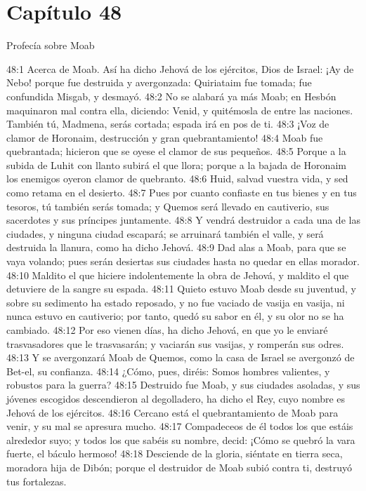 \section*{Capítulo 48 }
Profecía sobre Moab 
 
48:1 Acerca de Moab. Así ha dicho Jehová de los ejércitos, Dios de Israel: ¡Ay de Nebo! porque fue destruida y avergonzada: Quiriataim fue tomada; fue confundida Misgab, y desmayó. 
48:2 No se alabará ya más Moab; en Hesbón maquinaron mal contra ella, diciendo: Venid, y quitémosla de entre las naciones. También tú, Madmena, serás cortada; espada irá en pos de ti. 
48:3 ¡Voz de clamor de Horonaim, destrucción y gran quebrantamiento! 
48:4 Moab fue quebrantada; hicieron que se oyese el clamor de sus pequeños. 
48:5 Porque a la subida de Luhit con llanto subirá el que llora; porque a la bajada de Horonaim los enemigos oyeron clamor de quebranto. 
48:6 Huid, salvad vuestra vida, y sed como retama en el desierto. 
48:7 Pues por cuanto confiaste en tus bienes y en tus tesoros, tú también serás tomada; y Quemos será llevado en cautiverio, sus sacerdotes y sus príncipes juntamente. 
48:8 Y vendrá destruidor a cada una de las ciudades, y ninguna ciudad escapará; se arruinará también el valle, y será destruida la llanura, como ha dicho Jehová. 
48:9 Dad alas a Moab, para que se vaya volando; pues serán desiertas sus ciudades hasta no quedar en ellas morador. 
48:10 Maldito el que hiciere indolentemente la obra de Jehová, y maldito el que detuviere de la sangre su espada. 
48:11 Quieto estuvo Moab desde su juventud, y sobre su sedimento ha estado reposado, y no fue vaciado de vasija en vasija, ni nunca estuvo en cautiverio; por tanto, quedó su sabor en él, y su olor no se ha cambiado. 
48:12 Por eso vienen días, ha dicho Jehová, en que yo le enviaré trasvasadores que le trasvasarán; y vaciarán sus vasijas, y romperán sus odres. 
48:13 Y se avergonzará Moab de Quemos, como la casa de Israel se avergonzó de Bet-el, su confianza. 
48:14 ¿Cómo, pues, diréis: Somos hombres valientes, y robustos para la guerra? 
48:15 Destruido fue Moab, y sus ciudades asoladas, y sus jóvenes escogidos descendieron al degolladero, ha dicho el Rey, cuyo nombre es Jehová de los ejércitos. 
48:16 Cercano está el quebrantamiento de Moab para venir, y su mal se apresura mucho. 
48:17 Compadeceos de él todos los que estáis alrededor suyo; y todos los que sabéis su nombre, decid: ¡Cómo se quebró la vara fuerte, el báculo hermoso! 
48:18 Desciende de la gloria, siéntate en tierra seca, moradora hija de Dibón; porque el destruidor de Moab subió contra ti, destruyó tus fortalezas. 
